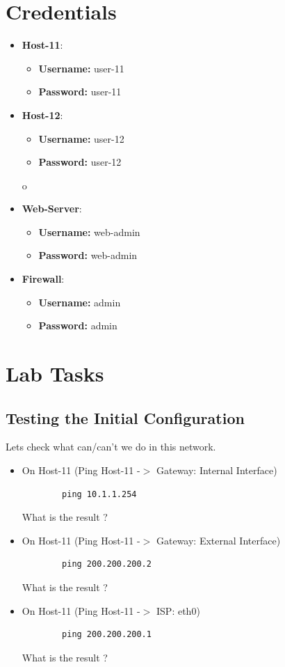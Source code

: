 \section{Credentials}
\begin{itemize}
	\item \textbf{Host-11}:
	\begin{itemize}
		\item \textbf{Username:} user-11
		\item \textbf{Password:} user-11
	\end{itemize}
	\item \textbf{Host-12}:
	\begin{itemize}
		\item \textbf{Username:} user-12
		\item \textbf{Password:} user-12
	\end{itemize}o
	\item \textbf{Web-Server}:
	\begin{itemize}
		\item \textbf{Username:} web-admin
		\item \textbf{Password:} web-admin
	\end{itemize}
	\item \textbf{Firewall}:
	\begin{itemize}
		\item \textbf{Username:} admin
		\item \textbf{Password:} admin
	\end{itemize}
\end{itemize}

\section{Lab Tasks}

\subsection{Testing the Initial Configuration}\label{Testing the Initial Configuration}
Lets check what can/can't we do in this network.
\newline
\begin{itemize}
	\item On Host-11 (Ping Host-11 -$>$ Gateway: Internal Interface)
	\begin{verbatim}
	    ping 10.1.1.254
	\end{verbatim}

	What is the result ?

	\item On Host-11 (Ping Host-11 -$>$ Gateway: External Interface)
	\begin{verbatim}
	    ping 200.200.200.2
	\end{verbatim}

	What is the result ?

	\item On Host-11 (Ping Host-11 -$>$ ISP: eth0)
	\begin{verbatim}
	    ping 200.200.200.1
	\end{verbatim}

	What is the result ?

\end{itemize}

